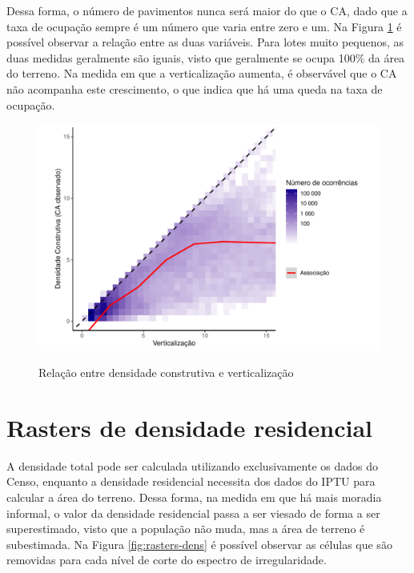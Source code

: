 \begin{apendicesenv}
Dessa forma, o número de pavimentos nunca será maior do que o CA, dado que a taxa de ocupação sempre é um número que varia entre zero e um. Na Figura \ref{fig:ca-vert} é possível observar a relação entre as duas variáveis. Para lotes muito pequenos, as duas medidas geralmente são iguais, visto que geralmente se ocupa 100\% da área do terreno. Na medida em que a verticalização aumenta, é observável que o CA não acompanha este crescimento, o que indica que há uma queda na taxa de ocupação.

\begin{figure}
    \centering
    \caption{Relação entre densidade construtiva e verticalização}
    \includegraphics[width = \textwidth]{imagens/ca_vs_verticalizacao.pdf}
    \label{fig:ca-vert}
\end{figure}

\chapter{Rasters de densidade residencial}
\label{appendix:rasters-corte}

A densidade total pode ser calculada utilizando exclusivamente os dados do Censo, enquanto a densidade residencial necessita dos dados do IPTU para calcular a área do terreno. Dessa forma, na medida em que há mais moradia informal, o valor da densidade residencial passa a ser viesado de forma a ser superestimado, visto que a população não muda, mas a área de terreno é subestimada. Na Figura \ref{fig:rasters-dens} é possível observar as células que são removidas para cada nível de corte do espectro de irregularidade.


\end{apendicesenv}
